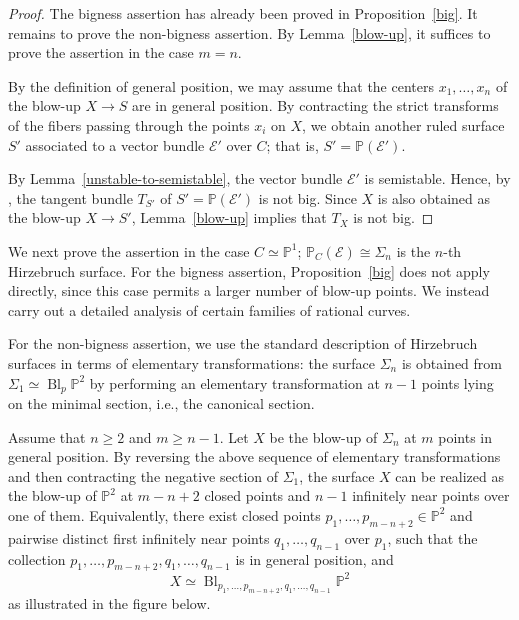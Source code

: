 \documentclass[reqno]{amsart}
\theoremstyle{definition}
\newcommand{\PP}{\mathbb{P}}
\newcommand{\Ee}{\mathcal{E}}
\newcommand{\tS}{X}
\newcommand{\Bl}{\operatorname{Bl}}
\begin{document}
\begin{proof}
The bigness assertion has already been proved in Proposition~\ref{big}.
It remains to prove the non-bigness assertion.
By Lemma~\ref{blow-up}, it suffices to prove the assertion in the case $m=n$.

By the definition of general position, we may assume that the centers $x_1,\ldots,x_n$ of the blow-up $\tS\to S$ are in general position.
By contracting the strict transforms of the fibers passing through the points $x_i$ on $\tS$, we obtain another ruled surface $S'$ associated to a vector bundle $\Ee'$ over $C$; that is, $S'=\PP(\Ee')$.

By Lemma~\ref{unstable-to-semistable}, the vector bundle $\Ee'$ is semistable.
Hence, by \cite{Kim23}, the tangent bundle $T_{S'}$ of $S'=\PP(\Ee')$ is not big.
Since $\tS$ is also obtained as the blow-up $\tS\to S'$, Lemma~\ref{blow-up} implies that $T_{\tS}$ is not big.
\end{proof}

We next prove the assertion in the case $C\simeq\PP^1$; $\PP_C(\Ee)\cong \Sigma_n$ is the $n$-th Hirzebruch surface.
For the bigness assertion, Proposition~\ref{big} does not apply directly, since this case permits a larger number of blow-up points.
We instead carry out a detailed analysis of certain families of rational curves.

For the non-bigness assertion, we use the standard description of Hirzebruch surfaces in terms of elementary transformations: the surface $\Sigma_n$ is obtained from $\Sigma_1\simeq \operatorname{Bl}_p\PP^2$ by performing an elementary transformation at $n-1$ points lying on the minimal section, i.e., the canonical section.

Assume that $n\geq 2$ and $m\ge n-1$.
Let $X$ be the blow-up of $\Sigma_n$ at $m$ points in general position.
By reversing the above sequence of elementary transformations and then contracting the negative section of $\Sigma_1$, the surface $X$ can be realized as the blow-up of $\PP^2$ at $m-n+2$ closed points and $n-1$ infinitely near points over one of them.
Equivalently, there exist closed points $p_1,\ldots,p_{m-n+2}\in\PP^2$ and pairwise distinct first infinitely near points $q_1,\ldots,q_{n-1}$ over $p_1$, such that the collection $p_1,\ldots,p_{m-n+2},q_1,\ldots,q_{n-1}$ is in general position, and
\[
X \simeq \Bl_{p_1,\ldots,p_{m-n+2},q_1,\ldots,q_{n-1}}\PP^2
\]
as illustrated in the figure below.
\end{document}

